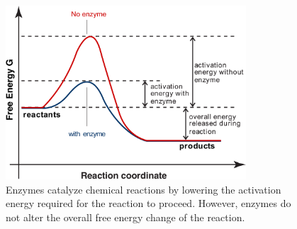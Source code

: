 \documentclass[11pt]{article}
\theoremstyle{definition}
\begin{document}
\begin{figure}[!h]\centering
\includegraphics[width=0.8\textwidth]{./figs/Fig-ReactionCoordinate_v2.pdf}
\caption{Enzymes catalyze chemical reactions by lowering the activation energy required for the reaction to proceed.
However, enzymes do not alter the overall free energy change of the reaction. }\label{fig-activation-barrier}
\end{figure}
\end{document}
